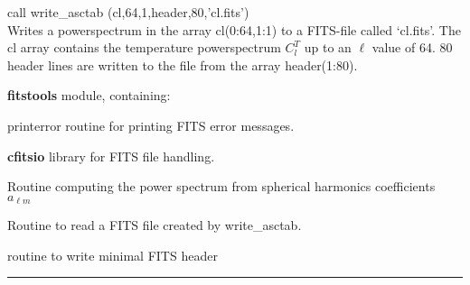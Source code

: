 \begin{example}
{
call write\_asctab (cl,64,1,header,80,'cl.fits')  \\
}
{
Writes a powerspectrum in the array cl(0:64,1:1) to a FITS-file called `cl.fits'. The cl array contains the temperature powerspectrum $C_l^T$ up to an $\ell$ value of 64. 80 header lines are written to the file from the array header(1:80).
}
\end{example}
\newpage
\begin{modules}
  \begin{sulist}{} %
  \item[\textbf{fitstools}] module, containing:
  \item[printerror] routine for printing FITS error messages.
  \item[\textbf{cfitsio}] library for FITS file handling.		
  \end{sulist}
\end{modules}

\begin{related}
  \begin{sulist}{} %
  \item[\htmlref{alm2cl}{sub:alm2cl}] Routine computing the power spectrum from
  spherical harmonics coefficients $a_{\ell m}$
  \item[\htmlref{fits2cl}{sub:fits2cl}] Routine to read a FITS file created by write\_asctab.
  \item[\htmlref{write\_minimal\_header}{sub:write_minimal_header}] routine to write minimal FITS header
  \end{sulist}
\end{related}

\rule{\hsize}{2mm}

\newpage
